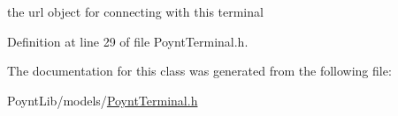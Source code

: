 the url object for connecting with this terminal 



Definition at line 29 of file Poynt\+Terminal.\+h.



The documentation for this class was generated from the following file\+:\begin{DoxyCompactItemize}
\item 
Poynt\+Lib/models/\hyperlink{_poynt_terminal_8h}{Poynt\+Terminal.\+h}\end{DoxyCompactItemize}
